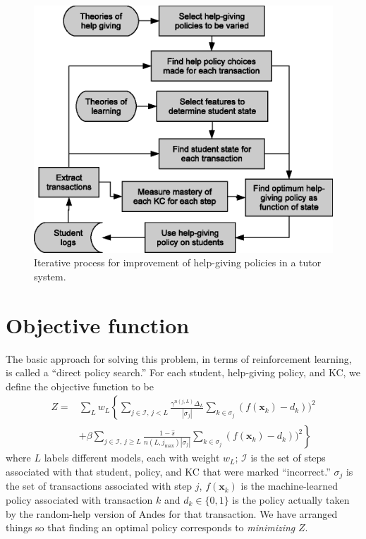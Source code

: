 \documentclass[11pt,letterpaper]{article}
\begin{document}
\begin{figure}
\centering    \includegraphics{process.eps}
\caption{Iterative process for improvement of help-giving policies in a
  tutor system.} \label{process}
\end{figure}



\section{Objective function}

The basic approach for solving this problem, in terms of reinforcement
learning, is called a ``direct policy search.''
For each student, help-giving policy, and KC, we define the objective 
function to be 
%
\begin{subequations}
  \label{objective}
  \begin{align}
  Z =& \sum_L w_L \left\{\sum_{j \in \mathcal{I},\,j<L}  
       \frac{\gamma^{n(j,L)} \Delta_L}{\left|\sigma_j\right|}
  \sum_{k\in \sigma_j} \left(f(\mathbf{x}_k)-d_k\right))^2 \right.
     \label{before} \\
  &+\beta \left. \sum_{j \in \mathcal{I},\,j \ge L} \frac{1-\hat{s}}
      {n(L,j_\mathrm{max})\left|\sigma_j\right|}
             \sum_{k\in \sigma_j} \left(f(\mathbf{x}_k)-d_k\right))^2
     \right\}
  \label{after}
  \end{align}
\end{subequations}
%
where $L$ labels different models, each with weight $w_L$;
$\mathcal{I}$ is the set of steps associated
with that student, policy, and KC that were marked ``incorrect.''  
$\sigma_j$ is the set of transactions associated with step $j$,
$f(\mathbf{x}_k)$ is the machine-learned policy associated
with transaction $k$ and
$d_k\in \{0,1\}$ is the
policy actually taken by the random-help version of Andes for that 
transaction.
We have arranged things so that finding an optimal policy 
corresponds to {\em minimizing} $Z$.
\end{document}

